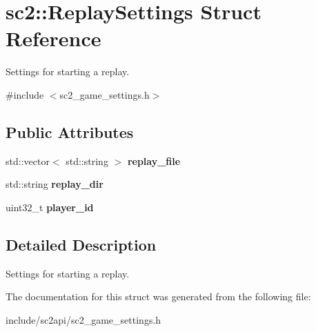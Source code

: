 \hypertarget{structsc2_1_1_replay_settings}{}\section{sc2\+:\+:Replay\+Settings Struct Reference}
\label{structsc2_1_1_replay_settings}


Settings for starting a replay.  




{\ttfamily \#include $<$sc2\+\_\+game\+\_\+settings.\+h$>$}

\subsection*{Public Attributes}
\begin{DoxyCompactItemize}
\item 
\mbox{\label{structsc2_1_1_replay_settings_a918978a607ae7442102deb298e2063df}} 
std\+::vector$<$ std\+::string $>$ {\bfseries replay\+\_\+file}
\item 
\mbox{\label{structsc2_1_1_replay_settings_af8a1ae47f40c2e026e7e56500bc09d6a}} 
std\+::string {\bfseries replay\+\_\+dir}
\item 
\mbox{\label{structsc2_1_1_replay_settings_a24e6faf9ea89fe0828421ad2af869ed7}} 
uint32\+\_\+t {\bfseries player\+\_\+id}
\end{DoxyCompactItemize}


\subsection{Detailed Description}
Settings for starting a replay. 

The documentation for this struct was generated from the following file\+:\begin{DoxyCompactItemize}
\item 
include/sc2api/sc2\+\_\+game\+\_\+settings.\+h\end{DoxyCompactItemize}
